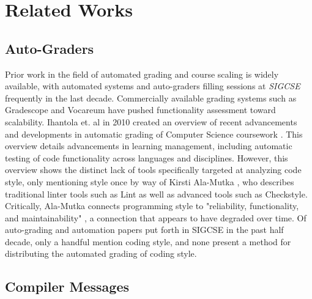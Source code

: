 \documentclass[sigconf]{acmart}
\begin{document}
\section{Related Works}

\subsection{Auto-Graders}

Prior work in the field of automated grading and course scaling is widely available,
with automated systems and auto-graders filling sessions at \textit{SIGCSE} frequently
in the last decade. Commercially available grading systems such as Gradescope
and Vocareum have pushed functionality assessment toward scalability. Ihantola et.
al in 2010 created an overview of recent advancements and developments in automatic
grading of Computer Science coursework \cite{10.1145/1930565.1930480}. This overview
details advancements in learning management, including automatic testing of code
functionality across languages and disciplines. However, this overview shows the
distinct lack of tools specifically targeted at analyzing code style, only mentioning
style once by way of Kirsti Ala-Mutka \cite{doi:10.1080/08993400500150747}, who describes
traditional linter tools such as Lint as well as advanced tools such as Checkstyle.
Critically, Ala-Mutka connects programming style to "reliability, functionality, and
maintainability" \cite{doi:10.1080/08993400500150747}, a connection that appears to have
degraded over time. Of auto-grading and automation papers put forth in SIGCSE in the past
half decade, only a handful mention coding style, and none present a method for
distributing the automated grading of coding style.
\\

\subsection{Compiler Messages}
\end{document}
